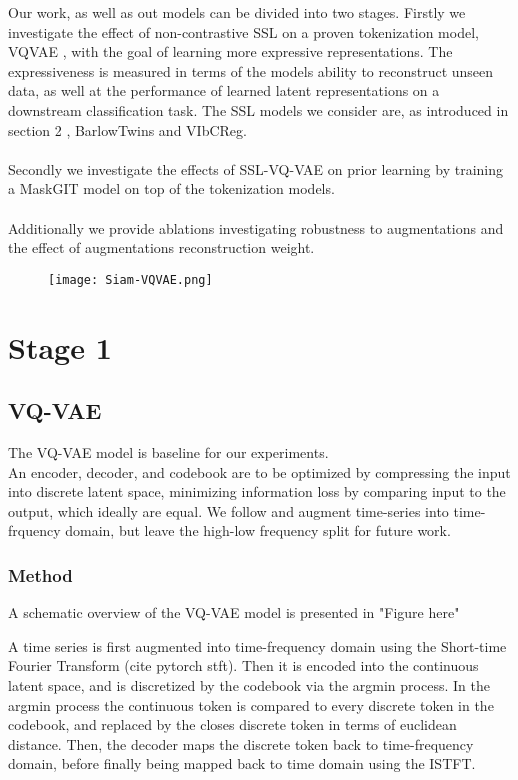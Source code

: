 \documentclass[../../thesis.tex]{subfiles}
\begin{document}
Our work, as well as out models can be divided into two stages. Firstly we investigate the effect of non-contrastive SSL on a proven tokenization model, VQVAE \cite{VQVAE}, with the goal of learning more expressive representations. The expressiveness is measured in terms of the models ability to reconstruct unseen data, as well at the performance of learned latent representations on a downstream classification task. The SSL models we consider are, as introduced in section 2 , BarlowTwins and VIbCReg.\\\\

Secondly we investigate the effects of SSL-VQ-VAE on prior learning by training a MaskGIT model on top of the tokenization models. \\\\

Additionally we provide ablations investigating robustness to augmentations and the effect of augmentations reconstruction weight. 




\begin{figure}[h]
    \texttt{[image: Siam-VQVAE.png]}
    \centering    
\end{figure}


\section{Stage 1}


\subsection{VQ-VAE}
The VQ-VAE model is baseline for our experiments.\\

An encoder, decoder, and codebook are to be optimized by compressing the input into discrete latent space, minimizing information loss by comparing input to the output, which ideally are equal. We follow \cite{TimeVQVAE} and augment time-series into time-frquency domain, but leave the high-low frequency split for future work.

\subsubsection{Method}
A schematic overview of the VQ-VAE model is presented in "Figure here"

A time series is first augmented into time-frequency domain using the Short-time Fourier Transform (cite pytorch stft). Then it is encoded into the continuous latent space, and is discretized by the codebook via the argmin process. In the argmin process the continuous token is compared to every discrete token in the codebook, and replaced by the closes discrete token in terms of euclidean distance. Then, the decoder maps the discrete token back to time-frequency domain, before finally being mapped back to time domain using the ISTFT.
\end{document}
